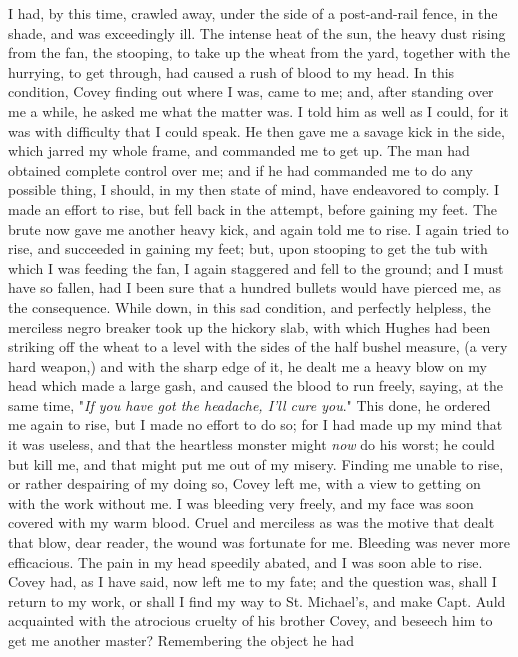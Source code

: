 I had, by this time, crawled away, under the side of a post-and-rail
fence, in the shade, and was exceedingly ill. The intense heat of the
sun, the heavy dust rising from the fan, the stooping, to take up the
wheat from the yard, together with the hurrying, to get through, had
caused a rush of blood to my head. In this condition, Covey finding out
where I was, came {}to me; and, after standing over me a while, he asked
me what the matter was. I told him as well as I could, for it was with
difficulty that I could speak. He then gave me a savage kick in the
side, which jarred my whole frame, and commanded me to get up. The man
had obtained complete control over me; and if he had commanded me to do
any possible thing, I should, in my then state of mind, have endeavored
to comply. I made an effort to rise, but fell back in the attempt,
before gaining my feet. The brute now gave me another heavy kick, and
again told me to rise. I again tried to rise, and succeeded in gaining
my feet; but, upon stooping to get the tub with which I was feeding the
fan, I again staggered and fell to the ground; and I must have so
fallen, had I been sure that a hundred bullets would have pierced me, as
the consequence. While down, in this sad condition, and perfectly
helpless, the merciless negro breaker took up the hickory slab, with
which Hughes had been striking off the wheat to a level with the sides
of the half bushel measure, (a very hard weapon,) and with the sharp
edge of it, he dealt me a heavy blow on my head which made a large gash,
and caused the blood to run freely, saying, at the same time, "\emph{If
you have got the headache, I'll cure you}." This done, he ordered me
again to rise, but I made no effort to do so; for I had made up my mind
that it was useless, and that the heartless monster might \emph{now} do
his worst; he could but kill me, and that might put me out of my misery.
Finding me unable to rise, or rather despairing of my doing so, Covey
left me, with a view to getting on with the work without me. I {}was
bleeding very freely, and my face was soon covered with my warm blood.
Cruel and merciless as was the motive that dealt that blow, dear reader,
the wound was fortunate for me. Bleeding was never more efficacious. The
pain in my head speedily abated, and I was soon able to rise. Covey had,
as I have said, now left me to my fate; and the question was, shall I
return to my work, or shall I find my way to St. Michael's, and make
Capt. Auld acquainted with the atrocious cruelty of his brother Covey,
and beseech him to get me another master? Remembering the object he had
